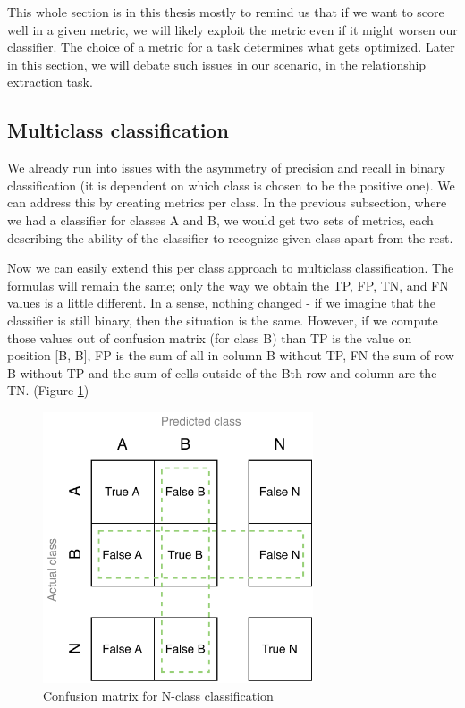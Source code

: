 This whole section is in this thesis mostly to remind us that if we want to score well in a given metric, we will likely exploit the metric even if it might worsen our classifier. The choice of a metric for a task determines what gets optimized. Later in this section, we will debate such issues in our scenario, in the relationship extraction task.





\subsection{Multiclass classification}


We already run into issues with the asymmetry of precision and recall in binary classification (it is dependent on which class is chosen to be the positive one). We can address this by creating metrics per class. In the previous subsection, where we had a classifier for classes A and B, we would get two sets of metrics, each describing the ability of the classifier to recognize given class apart from the rest.

Now we can easily extend this per class approach to multiclass classification. The formulas will remain the same; only the way we obtain the TP, FP, TN, and FN values is a little different. In a sense, nothing changed - if we imagine that the classifier is still binary, then the situation is the same. However, if we compute those values out of confusion matrix (for class B) than TP is the value on position [B, B], FP is the sum of all in column B without TP, FN the sum of row B without TP and the sum of cells outside of the Bth row and column are the TN. (Figure \ref{obr:BigCM})



\begin{figure}[h]\centering
\includegraphics[width=80mm]{./img//Diplomka diagramy-Big Confusion matric}
\caption{Confusion matrix for N-class classification}
\label{obr:BigCM}
\end{figure}






